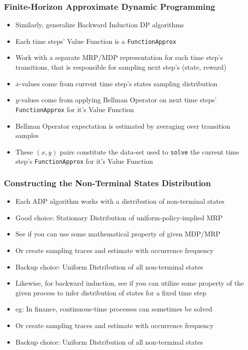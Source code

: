 \documentclass[handout]{beamer}
\begin{document}
\begin{frame}
\frametitle{Finite-Horizon Approximate Dynamic Programming}
\pause
\begin{itemize}[<+->]
\item Similarly, generalize Backward Induction DP algorithms
\item Each time steps' Value Function is a \lstinline{FunctionApprox}
\item Work with a separate MRP/MDP representation for each time step's transitions, that is responsible for sampling next step's (state, reward)
\item $x$-values come from current time step's states sampling distribution
\item $y$-values come from applying Bellman Operator on next time steps' \lstinline{FunctionApprox} for it's Value Function
\item  Bellman Operator expectation is estimated by averaging over transition samples
\item These $(x,y)$ pairs constitute the data-set used to \lstinline{solve} the current time step's \lstinline{FunctionApprox} for it's Value Function
\end{itemize}
\end{frame}

\begin{frame}
\frametitle{Constructing the Non-Terminal States Distribution}
\pause
\begin{itemize}[<+->]
\item Each ADP algorithm works with a distribution of non-terminal states
\item Good choice: Stationary Distribution of uniform-policy-implied MRP
\item See if you can use some mathematical property of given MDP/MRP
\item Or create sampling traces and estimate with occurrence frequency
\item Backup choice: Uniform Distribution of all non-terminal states
\item Likewise, for backward induction, see if you can utilize some property of the given process to infer distribution of states for a fixed time step
\item eg: In finance, continuous-time processes can sometimes be solved
\item Or create sampling traces and estimate with occurrence frequency
\item Backup choice: Uniform Distribution of all non-terminal states
\end{itemize}
\end{frame}
\end{document}
